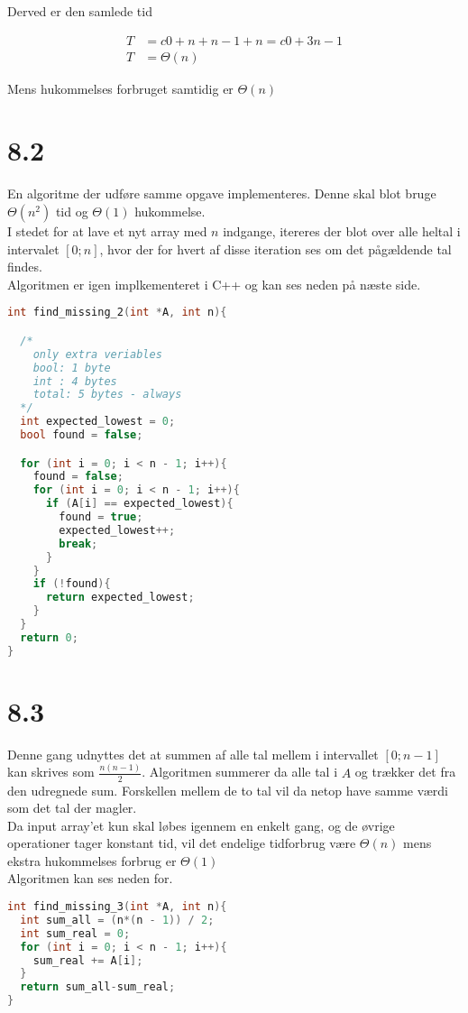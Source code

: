 Derved er den samlede tid 

\begin{align*}
T &= c0 + n + n-1 + n = c0 + 3n -1\\
T &= \Theta (n)
\end{align*}


Mens hukommelses forbruget samtidig er $\Theta (n)$


\section*{8.2}

En algoritme der udføre samme opgave implementeres. Denne skal 
blot bruge $\Theta (n^2)$ tid og $\Theta (1)$ hukommelse.\\

I stedet for at lave et nyt array med $n$ indgange, itereres der blot 
over alle heltal i intervalet $\left[0 ; n\right]$, hvor der for hvert
af disse iteration ses om det pågældende tal findes.\\

Algoritmen er igen implkementeret i C++ og kan ses neden på næste side.


\begin{lstlisting}[language=C++]
int find_missing_2(int *A, int n){

  /*
    only extra veriables
    bool: 1 byte
    int : 4 bytes
    total: 5 bytes - always
  */
  int expected_lowest = 0;
  bool found = false;

  for (int i = 0; i < n - 1; i++){
    found = false;
    for (int i = 0; i < n - 1; i++){
      if (A[i] == expected_lowest){
        found = true;
        expected_lowest++;
        break;
      }
    }
    if (!found){
      return expected_lowest;
    }
  }
  return 0;
}
\end{lstlisting}

\section*{8.3}

Denne gang udnyttes det at summen af alle tal mellem i intervallet
$\left[ 0; n-1 \right]$ kan skrives som $\frac{n\left( n-1 \right)}{2}$.
Algoritmen summerer da alle tal i $A$ og trækker det fra den udregnede sum.
Forskellen mellem de to tal vil da netop have samme værdi som det tal 
der magler.\\

Da input array'et kun skal løbes igennem en enkelt gang, og de øvrige operationer
tager konstant tid, vil det endelige tidforbrug være $\Theta (n)$ mens
ekstra hukommelses forbrug er  $\Theta (1)$\\

Algoritmen kan ses neden for.

\begin{lstlisting}[language=C++]
int find_missing_3(int *A, int n){
  int sum_all = (n*(n - 1)) / 2;
  int sum_real = 0;
  for (int i = 0; i < n - 1; i++){
    sum_real += A[i];
  }
  return sum_all-sum_real;
}
\end{lstlisting}





